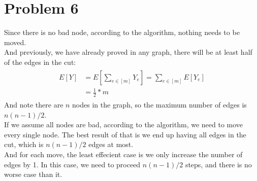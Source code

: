\documentclass[titlepage, paper=a4, fontsize=11pt]{scrartcl} %
\numberwithin{equation}{section} %
\numberwithin{figure}{section} %
\numberwithin{table}{section} %
\begin{document}

\section*{Problem 6}
Since there is no bad node, according to the algorithm, nothing needs to be moved. \\
And previously, we have already proved in any graph, there will be at least half of the edges in the cut:
\begin{align*} 
\begin{split}
E[Y] &= E[\sum_{e \in [m]} Y_e] = \sum_{e \in [m]} E[Y_e] \\
&= \frac{1}{2} * m
\end{split}					
\end{align*}
And note there are $n$ nodes in the graph, so the maximum number of edges is $n(n-1)/2$. \\
If we assume all nodes are bad, according to the algorithm, we need to move every single node. The best result of that is we end up having all edges in the cut, which is $n(n-1)/2$ edges at most. \\
And for each move, the least effecient case is we only increase the number of edges by 1. In this case, we need to proceed $n(n-1)/2$ steps, and there is no worse case than it.
\end{document}
